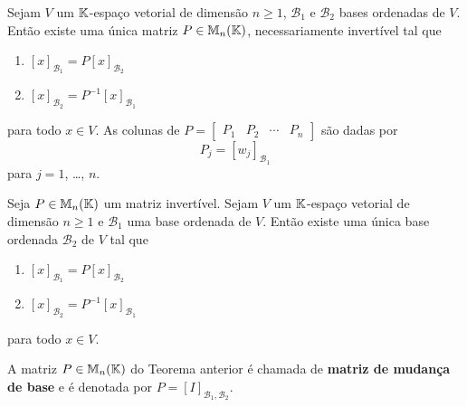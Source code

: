 \documentclass{beamer}
\begin{document}
\begin{frame}
    \begin{teorema}\label{teorema_mudanca_base}
        Sejam $V$ um $\mathbb{K}$-espaço vetorial de dimensão $n \ge 1$,  $\mathcal{B}_1$ e $\mathcal{B}_2$ bases ordenadas de $V$.  Então existe uma única matriz $P \in \mathbb{M}_n(\mathbb{K})$,  necessariamente invertível tal que
        \begin{enumerate}[label={\roman*})]
            \item $[x]_{\mathcal{B}_1} =  P[x]_{\mathcal{B}_2}$

            \vspace{1cm}

            \item $[x]_{\mathcal{B}_2} =  P^{-1}[x]_{\mathcal{B}_1}$
        \end{enumerate}

        \vspace{.2cm}

        para todo $x \in V$.  As colunas de $P = \begin{bmatrix}P_1 & P_2 & \cdots & P_n \end{bmatrix}$  são dadas por
        \[
            P_j = [w_j]_{\mathcal{B}_1}
        \]
        para $j = 1$, \dots, $n$.
    \end{teorema}
\end{frame}

\begin{frame}
    \begin{teorema}\label{teorema_matriz_mudanca_base}
        Seja $P \in \mathbb{M}_n(\mathbb{K})$ um matriz invertível.  Sejam $V$ um $\mathbb{K}$-espaço vetorial de dimensão $n \ge 1$  e $\mathcal{B}_1$ uma base ordenada de $V$.  Então existe uma única base ordenada $\mathcal{B}_2$  de $V$ tal que
        \begin{enumerate}[label={\roman*})]
            \item $[x]_{\mathcal{B}_1} =  P[x]_{\mathcal{B}_2}$

            \vspace{1cm}

            \item $[x]_{\mathcal{B}_2} =  P^{-1}[x]_{\mathcal{B}_1}$
        \end{enumerate}

        \vspace{.2cm}

        para todo $x \in V$.
\end{teorema}
\end{frame}

\begin{frame}
    \begin{definicao}
        A matriz $P \in \mathbb{M}_n(\mathbb{K})$  do Teorema anterior  é chamada de \textbf{matriz de mudança de base}  e é denotada por $P = [I]_{{\mathcal{B}_1},{\mathcal{B}_2}}$.
    \end{definicao}
\end{frame}
\end{document}
